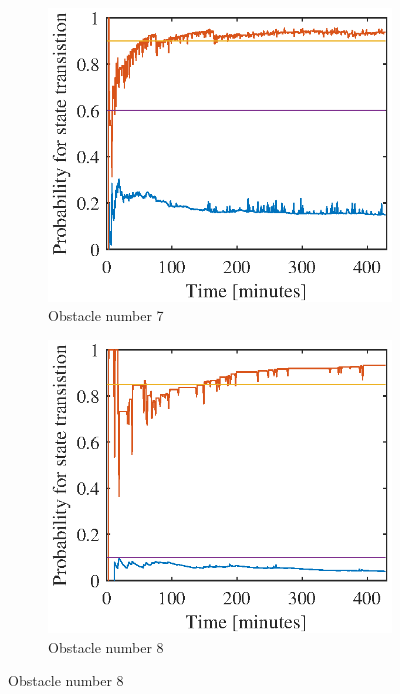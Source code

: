 \begin{figure}[htbp]
	\begin{subfigure}[t]{0.5\linewidth}
		\centering
		\includegraphics[width=1\linewidth]{chapters/appendix/figures/learning_curves/obs7}
		\caption{Obstacle number 7}
	\end{subfigure}
	\hspace*{\fill}
	\begin{subfigure}[t]{0.5\linewidth}
		\centering
		\includegraphics[width=1\linewidth]{chapters/appendix/figures/learning_curves/obs8}
		\caption{Obstacle number 8}
	\end{subfigure}



\end{figure}
